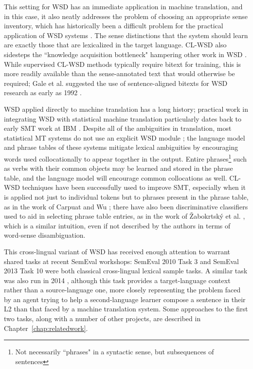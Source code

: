 This setting for WSD has an immediate application in machine translation, and
in this case, it
also neatly addresses the problem of choosing an appropriate sense inventory,
which has historically been a difficult problem for the practical application
of WSD systems \cite{agirre2006word}. The sense distinctions that the system
should learn are exactly those that are lexicalized in the target language.
CL-WSD also sidesteps the ``knowledge acquisition bottleneck" hampering other
work in WSD \cite{lefever-hoste-decock:2011:ACL-HLT2011}.
While supervised CL-WSD methods typically require bitext for training, this is
more readily available than the sense-annotated text that would otherwise be
required; Gale et al. suggested the use of sentence-aligned bitexts for
WSD research as early as 1992 \cite{gale1992method}.

WSD applied directly to machine translation has a long history; practical work
in integrating WSD with statistical machine translation particularly dates back
to early SMT work at IBM \cite{Brown91word-sensedisambiguation}.
Despite all of the ambiguities in translation,
most statistical MT systems do not use an explicit WSD module
\cite[Chapter~3]{agirre2006word};
the language model and phrase tables of these systems mitigate lexical
ambiguities by encouraging words used collocationally to appear together in the
output. Entire phrases\footnote{Not necessarily ``phrases" in a syntactic
sense, but subsequences of sentences} such as verbs with their common objects
may be learned and stored in the phrase table, and the language model will
encourage common collocations as well. CL-WSD techniques have been successfully
used to improve SMT, especially when it is applied not just to individual
tokens but to phrases present in the phrase table, as in the work of Carpuat
and Wu \cite{carpuatpsd}; there have also been discriminative classifiers used
to aid in selecting phrase table entries, as in the work of 
Žabokrtsk\'{y} et al. \cite{vzabokrtsky-popel-marevcek:2010:WMT}, which
is a similar intuition, even if not described by the authors in terms of
word-sense disambiguation.

This cross-lingual variant of WSD has received enough attention to warrant
shared tasks at recent SemEval workshops: SemEval 2010 Task 3
\cite{lefever-hoste:2010:SemEval} and SemEval 2013 Task 10 \cite{task10} were
both classical cross-lingual lexical sample tasks. 
A similar task was also run in 2014 \cite{vangompel-EtAl:2014:SemEval},
although this task provides a target-language context rather than a
source-language one, more closely representing the problem faced by an agent
trying to help a second-language learner compose a sentence in their L2 than
that faced by a machine translation system.
Some approaches to the first two tasks, along with a number of other projects,
are described in Chapter~\ref{chap:relatedwork}.

